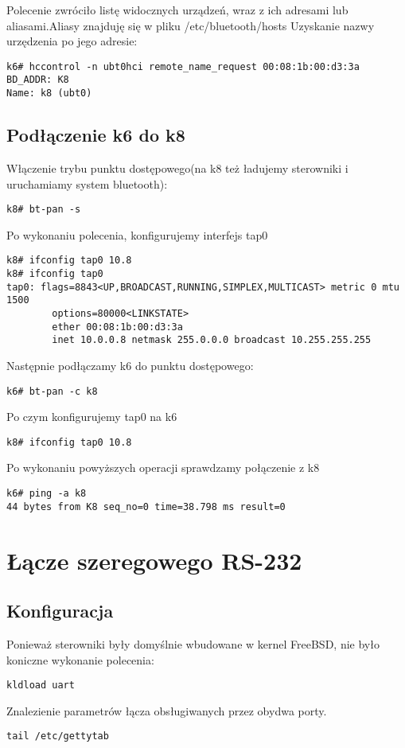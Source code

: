 \documentclass[a4paper,11pt,notitlepage]{article}
\begin{document}
Polecenie zwróciło listę widocznych urządzeń, wraz z ich adresami lub aliasami.Aliasy znajduję się w pliku /etc/bluetooth/hosts
Uzyskanie nazwy urzędzenia po jego adresie:

\begin{verbatim}
k6# hccontrol -n ubt0hci remote_name_request 00:08:1b:00:d3:3a
BD_ADDR: K8
Name: k8 (ubt0)
\end{verbatim}

\subsection{Podłączenie k6 do k8}
Włączenie trybu punktu dostępowego(na k8 też ładujemy sterowniki i uruchamiamy system bluetooth):
\begin{verbatim}
k8# bt-pan -s
\end{verbatim}
Po wykonaniu polecenia, konfigurujemy interfejs tap0
\begin{verbatim}
k8# ifconfig tap0 10.8
k8# ifconfig tap0
tap0: flags=8843<UP,BROADCAST,RUNNING,SIMPLEX,MULTICAST> metric 0 mtu 1500
        options=80000<LINKSTATE>
        ether 00:08:1b:00:d3:3a
        inet 10.0.0.8 netmask 255.0.0.0 broadcast 10.255.255.255
\end{verbatim}

Następnie podłączamy k6 do punktu dostępowego:

\begin{verbatim}
k6# bt-pan -c k8
\end{verbatim}
Po czym konfigurujemy tap0 na k6
\begin{verbatim}
k8# ifconfig tap0 10.8
\end{verbatim}
Po wykonaniu powyższych operacji sprawdzamy połączenie z k8
\begin{verbatim}
k6# ping -a k8
44 bytes from K8 seq_no=0 time=38.798 ms result=0
\end{verbatim}

\section{Łącze szeregowego RS-232}
\subsection{Konfiguracja}
Ponieważ sterowniki były domyślnie wbudowane w kernel FreeBSD,
nie było koniczne wykonanie polecenia:
\begin{verbatim}
kldload uart
\end{verbatim}
Znalezienie parametrów łącza obsługiwanych przez obydwa porty.
\begin{verbatim}
tail /etc/gettytab
\end{verbatim}
\end{document}
